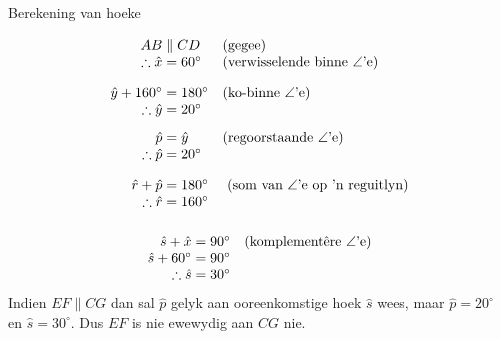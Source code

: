 \begin{wex}{Berekening van hoeke}
{\begin{center}
{}
 \end{center}
} 
{

\begin{equation*}
\begin{array}{r@{\;}l@{\quad}l}
AB &\parallel CD & \mbox{(gegee)} \\
\therefore \hat{x}&=60^{\circ} & \mbox{(verwisselende binne $\angle$'e)}  \vspace{10pt} \\

\hat{y} + 160^\circ &= 180^{\circ}  & \mbox{(ko-binne $\angle$'e)} \\
\therefore \hat{y} &= 20^{\circ} &   \vspace{8pt}\\


\hat{p} &= \hat{y} & \mbox{(regoorstaande $\angle$'e)} \\
\therefore \hat{p} &= 20^{\circ} &  \vspace{10pt}\\



 \hat{r} + \hat{p} &= 180^{\circ}  &\mbox{ (som van $\angle$'e op 'n reguitlyn)} \\
\therefore \hat{r} &= 160^{\circ} &  \vspace{10pt}\\

\end{array}
\end{equation*} 
\begin{equation*}
\begin{array}{r@{\;}l@{\quad}l}
 \hat{s} + \hat{x} &= 90^{\circ}  & \mbox{(komplementêre $\angle$'e)} \\ 
 \hat{s} + 60^\circ &= 90^{\circ} & \\
\therefore \hat{s} &= 30^{\circ} &  
\end{array}
\end{equation*} 
Indien $EF \parallel CG$ dan sal $\hat{p}$ gelyk aan ooreenkomstige hoek $\hat{s}$ wees, maar $\hat{p} = 20^{\circ}$ en
$\hat{s}= 30^{\circ}$. Dus $EF$ is nie ewewydig aan $ CG$ nie.

}
\end{wex}


